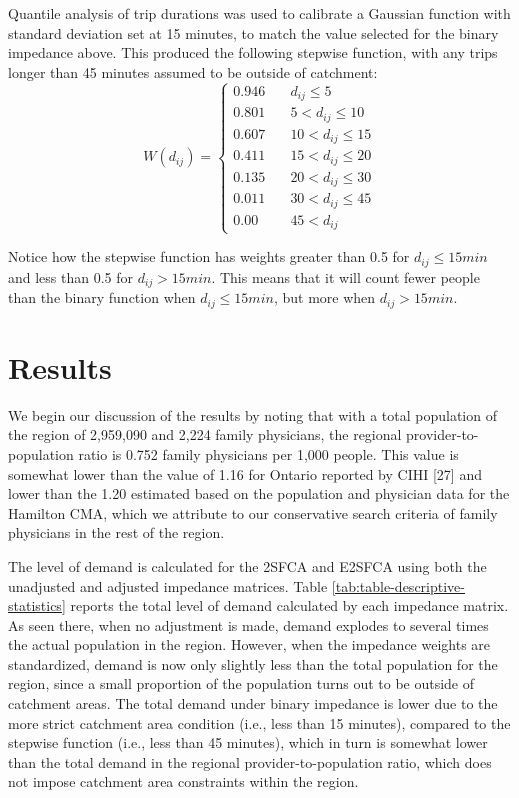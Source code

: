 \documentclass[10pt,letterpaper]{article}
\begin{document}
Quantile analysis of trip durations was used to calibrate a Gaussian
function with standard deviation set at 15 minutes, to match the value
selected for the binary impedance above. This produced the following
stepwise function, with any trips longer than 45 minutes assumed to be
outside of catchment: \[
W(d_{ij}) = \left\{
        \begin{array}{ll}
            0.946 & \quad d_{ij} \leq 5 \\
            0.801 & \quad 5 < d_{ij} \leq 10 \\
            0.607 & \quad 10 < d_{ij} \leq 15 \\
            0.411 & \quad 15 < d_{ij} \leq 20 \\
            0.135 & \quad 20 < d_{ij} \leq 30 \\
            0.011 & \quad 30 < d_{ij} \leq 45 \\
            0.00 & \quad 45 < d_{ij}
        \end{array}
    \right.
\]

Notice how the stepwise function has weights greater than 0.5 for
\(d_{ij} \leq 15 min\) and less than 0.5 for \(d_{ij} > 15 min\). This
means that it will count fewer people than the binary function when
\(d_{ij} \leq 15 min\), but more when \(d_{ij} > 15 min\).

\section{Results}\label{results}

We begin our discussion of the results by noting that with a total
population of the region of 2,959,090 and 2,224 family physicians, the
regional provider-to-population ratio is 0.752 family physicians per
1,000 people. This value is somewhat lower than the value of 1.16 for
Ontario reported by CIHI {[}27{]} and lower than the 1.20 estimated
based on the population and physician data for the Hamilton CMA, which
we attribute to our conservative search criteria of family physicians in
the rest of the region.

The level of demand is calculated for the 2SFCA and E2SFCA using both
the unadjusted and adjusted impedance matrices. Table
\ref{tab:table-descriptive-statistics} reports the total level of demand
calculated by each impedance matrix. As seen there, when no adjustment
is made, demand explodes to several times the actual population in the
region. However, when the impedance weights are standardized, demand is
now only slightly less than the total population for the region, since a
small proportion of the population turns out to be outside of catchment
areas. The total demand under binary impedance is lower due to the more
strict catchment area condition (i.e., less than 15 minutes), compared
to the stepwise function (i.e., less than 45 minutes), which in turn is
somewhat lower than the total demand in the regional
provider-to-population ratio, which does not impose catchment area
constraints within the region.
\end{document}
